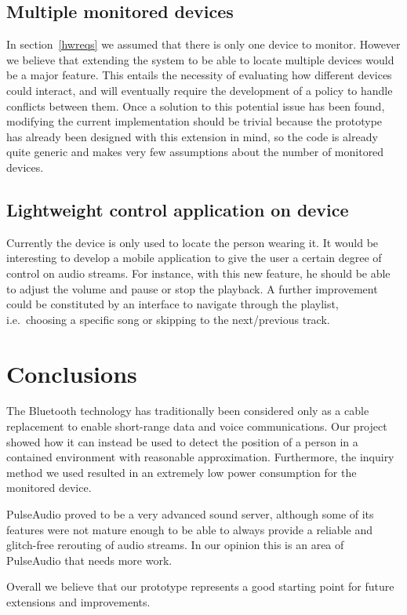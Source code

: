 \documentclass{IEEEtran}
\begin{document}
\subsection{Multiple monitored devices}
In section~\ref{hwreqs} we assumed that there is only one device to monitor. However we believe that extending the system to be able to locate multiple devices would be a major feature. This entails the necessity of evaluating how different devices could interact, and will eventually require the development of a policy to handle conflicts between them. Once a solution to this potential issue has been found, modifying the current implementation should be trivial because the prototype has already been designed with this extension in mind, so the code is already quite generic and makes very few assumptions about the number of monitored devices.

\subsection{Lightweight control application on device}
Currently the device is only used to locate the person wearing it. It would be interesting to develop a mobile application to give the user a certain degree of control on audio streams. For instance, with this new feature, he should be able to adjust the volume and pause or stop the playback. A further improvement could be constituted by an interface to navigate through the playlist, i.e.\ choosing a specific song or skipping to the next/previous track.


\vspace{5mm}
\section{Conclusions}
The Bluetooth technology has traditionally been considered only as a cable replacement to enable short-range data and voice communications. Our project showed how it can instead be used to detect the position of a person in a contained environment with reasonable approximation. Furthermore, the inquiry method we used resulted in an extremely low power consumption for the monitored device.

PulseAudio proved to be a very advanced sound server, although some of its features were not mature enough to be able to always provide a reliable and glitch-free rerouting of audio streams. In our opinion this is an area of PulseAudio that needs more work.

Overall we believe that our prototype represents a good starting point for future extensions and improvements.
\end{document}
